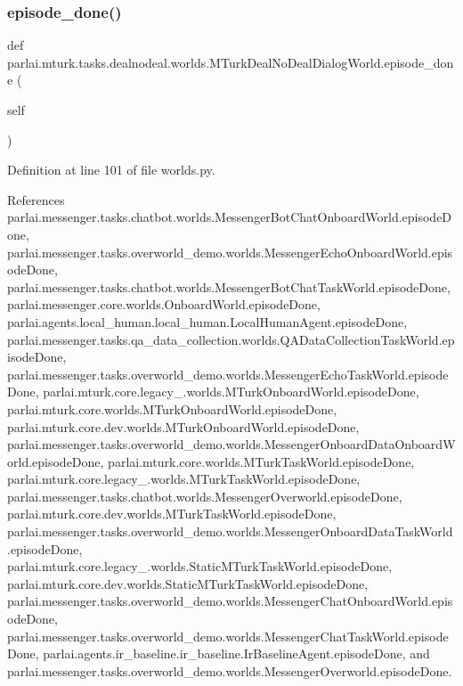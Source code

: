 \subsubsection{\texorpdfstring{episode\+\_\+done()}{episode\_done()}}
{\footnotesize\ttfamily def parlai.\+mturk.\+tasks.\+dealnodeal.\+worlds.\+M\+Turk\+Deal\+No\+Deal\+Dialog\+World.\+episode\+\_\+done (\begin{DoxyParamCaption}\item[{}]{self }\end{DoxyParamCaption})}



Definition at line 101 of file worlds.\+py.



References parlai.\+messenger.\+tasks.\+chatbot.\+worlds.\+Messenger\+Bot\+Chat\+Onboard\+World.\+episode\+Done, parlai.\+messenger.\+tasks.\+overworld\+\_\+demo.\+worlds.\+Messenger\+Echo\+Onboard\+World.\+episode\+Done, parlai.\+messenger.\+tasks.\+chatbot.\+worlds.\+Messenger\+Bot\+Chat\+Task\+World.\+episode\+Done, parlai.\+messenger.\+core.\+worlds.\+Onboard\+World.\+episode\+Done, parlai.\+agents.\+local\+\_\+human.\+local\+\_\+human.\+Local\+Human\+Agent.\+episode\+Done, parlai.\+messenger.\+tasks.\+qa\+\_\+data\+\_\+collection.\+worlds.\+Q\+A\+Data\+Collection\+Task\+World.\+episode\+Done, parlai.\+messenger.\+tasks.\+overworld\+\_\+demo.\+worlds.\+Messenger\+Echo\+Task\+World.\+episode\+Done, parlai.\+mturk.\+core.\+legacy\+\_.\+worlds.\+M\+Turk\+Onboard\+World.\+episode\+Done, parlai.\+mturk.\+core.\+worlds.\+M\+Turk\+Onboard\+World.\+episode\+Done, parlai.\+mturk.\+core.\+dev.\+worlds.\+M\+Turk\+Onboard\+World.\+episode\+Done, parlai.\+messenger.\+tasks.\+overworld\+\_\+demo.\+worlds.\+Messenger\+Onboard\+Data\+Onboard\+World.\+episode\+Done, parlai.\+mturk.\+core.\+worlds.\+M\+Turk\+Task\+World.\+episode\+Done, parlai.\+mturk.\+core.\+legacy\+\_.\+worlds.\+M\+Turk\+Task\+World.\+episode\+Done, parlai.\+messenger.\+tasks.\+chatbot.\+worlds.\+Messenger\+Overworld.\+episode\+Done, parlai.\+mturk.\+core.\+dev.\+worlds.\+M\+Turk\+Task\+World.\+episode\+Done, parlai.\+messenger.\+tasks.\+overworld\+\_\+demo.\+worlds.\+Messenger\+Onboard\+Data\+Task\+World.\+episode\+Done, parlai.\+mturk.\+core.\+legacy\+\_.\+worlds.\+Static\+M\+Turk\+Task\+World.\+episode\+Done, parlai.\+mturk.\+core.\+dev.\+worlds.\+Static\+M\+Turk\+Task\+World.\+episode\+Done, parlai.\+messenger.\+tasks.\+overworld\+\_\+demo.\+worlds.\+Messenger\+Chat\+Onboard\+World.\+episode\+Done, parlai.\+messenger.\+tasks.\+overworld\+\_\+demo.\+worlds.\+Messenger\+Chat\+Task\+World.\+episode\+Done, parlai.\+agents.\+ir\+\_\+baseline.\+ir\+\_\+baseline.\+Ir\+Baseline\+Agent.\+episode\+Done, and parlai.\+messenger.\+tasks.\+overworld\+\_\+demo.\+worlds.\+Messenger\+Overworld.\+episode\+Done.


